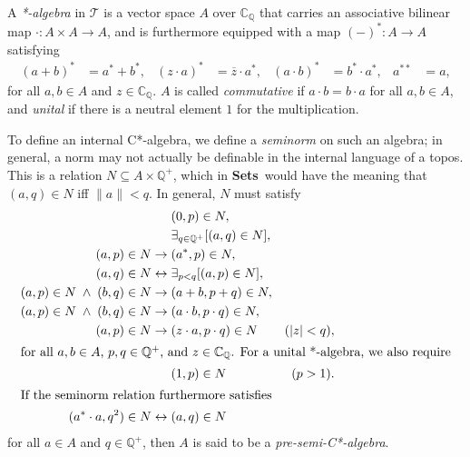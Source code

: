 \documentclass[11pt]{article}
\newcommand{\Sets}{\mbox{\textbf{Sets}}}
\newcommand{\CT}{{\mathcal T}} \newcommand{\CV}{{\mathcal V}}
\newcommand{\cpxrat}{\ensuremath{\field{C}_\field{Q}}}
\newcommand{\field}[1]{\ensuremath{\mathbb{#1}}}
\begin{document}
 A \emph{*-algebra} in $\CT$ is a vector space ${A}$ over $\cpxrat$
  that carries an associative bilinear map
$\cdot\colon{A}\times{A}\to{A}$,
and is furthermore equipped with a map
$(-)^*\colon{A}\to{A}$ satisfying
\begin{align*}
    (a+b)^* & = a^* + b^*,
  & (z\cdot a)^* & = \overline{z} \cdot a^*,
  & (a\cdot b)^* & = b^* \cdot a^*,
  & a^{**} & = a,
\end{align*}
for all $a,b \in {A}$ and $z \in \cpxrat$. $A$ is called
\emph{commutative} if $a \cdot b = b \cdot a$ for all $a,b \in
{A}$, and \emph{unital} if there is a neutral element $1$ for the
multiplication.

To define an internal C*-algebra, we define a {\it seminorm} on such an algebra;
in
general, a norm may not actually be definable in the internal language of a
topos. This is a relation  $N \subseteq
{A} \times \field{Q}^+$, which in \Sets\  would have the meaning that
$(a,q)\in N$ iff $\|a\|< q$. In general, $N$ must satisfy
\begin{align*}
   &\;(0,p) \in N, \\
   &\;\exists_{q \in \field{Q}^+}[ (a,q) \in N ], \\
   (a,p) \in N \rightarrow &\; (a^*,p) \in N, \\
   (a,q) \in N \leftrightarrow &\;\exists_{p<q}[ (a,p) \in N ], \\
   (a,p) \in N \;\wedge\; (b,q) \in N \rightarrow&\;
     (a+b,p+q) \in N, \\
   (a,p) \in N \;\wedge\; (b,q) \in N \rightarrow&\;
     (a \cdot b,p \cdot q) \in N, \\
   (a,p) \in N \rightarrow &\; (z\cdot a,p \cdot q) \in N & (|z|<q), \\
\intertext{for all $a,b \in {A}$, $p,q \in \field{Q}^+$, and $z
\in \cpxrat$. For a unital *-algebra, we also require}
   &\;(1,p) \in N & (p>1).\\
\intertext{If the seminorm relation furthermore satisfies }
  (a^* \cdot a, q^2) \in N \leftrightarrow&\; (a,q) \in N
\end{align*}
for all $a \in {A}$ and $q \in \field{Q}^+$, then ${A}$ is said
to be a \emph{pre-semi-C*-algebra}.
\end{document}
